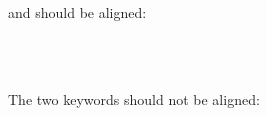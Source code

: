 \documentclass{article}
\begin{document}
 and  should be aligned:
\begin{code}%
%
\>[2]\<%
\\
\>[2][@{}l@{\AgdaIndent{0}}]%
\>[4]%
\>[12]\<%
\\
%
\>[12]\AgdaSpace{}%
\AgdaSymbol{:}\AgdaSpace{}%
\<%
\end{code}

The two  keywords should not be aligned:
\begin{code}%
%
\>[2]\AgdaSpace{}%
\AgdaSpace{}%
\AgdaSymbol{:}\AgdaSpace{}%
\AgdaSpace{}%
%
\>[25]\AgdaSpace{}%
\AgdaSpace{}%
\AgdaSymbol{:}\AgdaSpace{}%
\<%
\\
\>[25][@{}l@{\AgdaIndent{0}}]%
\>[26]\AgdaSpace{}%
\AgdaSpace{}%
\AgdaSymbol{:}\AgdaSpace{}%
\<%
\end{code}
\end{document}
